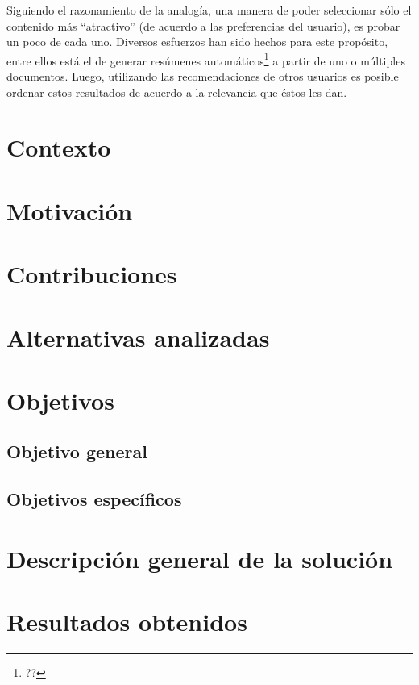 \documentclass[upright, contnum]{umemoria}
\begin{document}
Siguiendo el razonamiento de la analogía, una manera de poder
seleccionar sólo el contenido más ``atractivo'' (de acuerdo a las
preferencias del usuario), es probar un poco de cada uno. Diversos
esfuerzos han sido hechos para este propósito, entre ellos está el de
generar resúmenes automáticos\footnote{?? } a partir de uno o múltiples
documentos. Luego, utilizando las recomendaciones de otros usuarios es
posible ordenar estos resultados de acuerdo a la relevancia que éstos
les dan.

\section{Contexto}
\label{sec-1.1}

\section{Motivación}
\label{sec-1.2}

\section{Contribuciones}
\label{sec-1.3}

\section{Alternativas analizadas}
\label{sec-1.4}

\section{Objetivos}
\label{sec-1.5}

\subsection{Objetivo general}
\label{sec-1.5.1}

\subsection{Objetivos específicos}
\label{sec-1.5.2}

\section{Descripción general de la solución}
\label{sec-1.6}

\section{Resultados obtenidos}
\label{sec-1.7}
\end{document}

